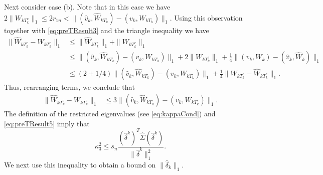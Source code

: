 \documentclass[opre,nonblindrev]{informs3} %
\begin{document}
\begin{APPENDIX}{}
Next consider case (b).
Note that in this case we have
$ 2\|W_{kT^c_k}\|_1 \leq 2r_{1n} <\|(\hat v_k,\hat W_{kT_k})-(v_k,W_{kT_k}) \|_1$.
Using this observation together with \eqref{eq:preTResult3} and the triangle inequality we have
\begin{equation}\label{eq:preTResult4}
\begin{aligned}
\|\hat W_{kT^c_k} - W_{kT^c_k} \|_1
&\leq
\|\hat W_{kT_k^c} \|_1
+
\|W_{kT^c_k}\|_1\\
&\leq
\|(\hat v_k,\hat W_{kT_k})- ( v_k, W_{kT_k}) \|_1
+ 2\| W_{kT_k^c} \|_1
+ \frac{1}{4} \| (v_k,W_k)-(\hat v_k,\hat W_k) \|_1\\
&\leq
(2+1/4)\|(\hat v_k,\hat W_{kT_k})- ( v_k, W_{kT_k}) \|_1
+ \frac{1}{4} \| W_{kT_k^c}-\hat{W}_{kT_k^c} \|_1.
\end{aligned}
\end{equation}
Thus, rearranging terms, we conclude that
\begin{equation}\label{eq:preTResult5}
\begin{aligned}
\|\hat W_{kT^c_k} - W_{kT^c_k} \|_1
&\leq
3\|(\hat v_k,\hat W_{kT_k})- ( v_k, W_{kT_k}) \|_1.
\end{aligned}
\end{equation}
The definition of the restricted eigenvalues (see \eqref{eq:kappaCond}) and  \eqref{eq:preTResult5} imply that
\begin{equation}\label{eq:K3}
\kappa^2_{3} \leq s_n \frac{(\hat\delta^k)^T \hat{\Sigma} (\hat\delta^k) }{\|\hat\delta^k \|_1^2}.
\end{equation}
We next use this inequality to obtain a bound on $\|\hat{\delta}_k\|_1$.





\end{APPENDIX}
\end{document}

